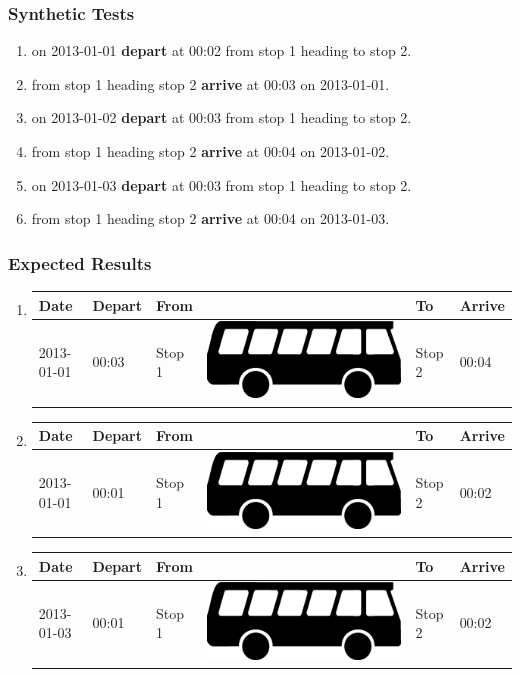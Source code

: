 \documentclass[a4paper,11pt]{article}
\newcommand*{\bus}{\includegraphics[scale=0.02]{img/bus}}
\begin{document}
\begin{enumerate}
\begin{enumerate}
\subsubsection*{Synthetic Tests}
\begin{enumerate}
\item on 2013-01-01 \textbf{depart} at 00:02 from stop 1 heading to stop 2.
\item from stop 1 heading stop 2 \textbf{arrive} at 00:03 on 2013-01-01.

\item on 2013-01-02 \textbf{depart} at 00:03 from stop 1 heading to stop 2.
\item from stop 1 heading stop 2 \textbf{arrive} at 00:04 on 2013-01-02.

\item on 2013-01-03 \textbf{depart} at 00:03 from stop 1 heading to stop 2.
\item from stop 1 heading stop 2 \textbf{arrive} at 00:04 on 2013-01-03.
\end{enumerate}


\subsubsection*{Expected Results}
\begin{enumerate}
\item
{\scriptsize
\begin{tabular}{p{1.4cm} | p{.75cm} | p{2.1cm} c p{2.1cm} | p{.75cm} }
\hline
\rowcolor{Gray}
Date & Depart & From & & To & Arrive \\
\hline
2013-01-01 & 00:03 & Stop 1 & \bus & Stop 2 & 00:04 \\
\hline
\end{tabular}
}

\item
{\scriptsize
\begin{tabular}{p{1.4cm} | p{.75cm} | p{2.1cm} c p{2.1cm} | p{.75cm} }
\hline
\rowcolor{Gray}
Date & Depart & From & & To & Arrive \\
\hline
2013-01-01 & 00:01 & Stop 1 & \bus & Stop 2 & 00:02 \\
\hline
\end{tabular}
}

\item
{\scriptsize
\begin{tabular}{p{1.4cm} | p{.75cm} | p{2.1cm} c p{2.1cm} | p{.75cm} }
\hline
\rowcolor{Gray}
Date & Depart & From & & To & Arrive \\
\hline
2013-01-03 & 00:01 & Stop 1 & \bus & Stop 2 & 00:02 \\
\hline
\end{tabular}
}


\end{enumerate}
\end{enumerate}
\end{enumerate}
\end{document}

